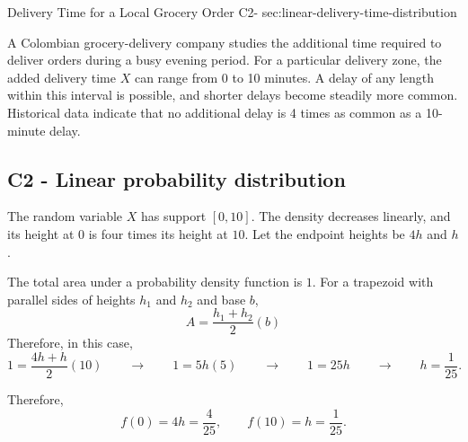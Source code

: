 	\sectionScored
	{Delivery Time for a Local Grocery Order}
	{C2-}
	{sec:linear-delivery-time-distribution}
	{
		A Colombian grocery-delivery company studies the additional time
		required to deliver orders during a busy evening period. For a particular
		delivery zone, the added delivery time \(X\) can range from 0 to
		10 minutes. A delay of any length within this interval is possible, and
		shorter delays become steadily more common. Historical data indicate
		that no additional delay is 4 times as common as a 10-minute delay.
		
		
		\label{subsec:linear-delivery-time-probabilities}
		\subsection*{C2 - Linear probability distribution }
		
		The random variable \(X\) has support \([0,10]\). The density decreases
		linearly, and its height at \(0\) is four times its height at \(10\).
		Let the endpoint heights be \(4h\) and \(h\).
		
		

		The total area under a probability density function is \(1\).
		For a trapezoid with parallel sides of heights \(h_1\) and \(h_2\) and base \(b\),
		\[
		A=\frac{h_1+h_2}{2} (b)
		\]
		Therefore, in this case,
		\[
		1=\frac{4h+h}{2}(10)
		\qquad \rightarrow \qquad
		1=5h(5)
		\qquad \rightarrow \qquad
		1=25h
		\qquad \rightarrow \qquad
		h=\frac1{25}.
		\]
		
		Therefore,
		\[
		f(0)= 4h = \frac4{25},
		\qquad
		f(10)= h = \frac1{25}.
		\]
		
		

}
